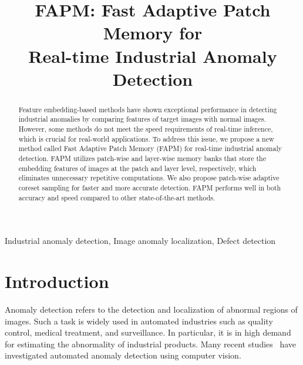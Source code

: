 \documentclass{article}
\title{FAPM: Fast Adaptive Patch Memory for \\Real-time Industrial Anomaly Detection\vspace{-0.2cm}}
\begin{document}
\maketitle

\setlength{\textfloatsep}{7pt}
\begin{abstract}
	    Feature embedding-based methods have shown exceptional performance in detecting industrial anomalies by comparing features of target images with normal images. However, some methods do not meet the speed requirements of real-time inference, which is crucial for real-world applications. To address this issue, we propose a new method called Fast Adaptive Patch Memory (FAPM) for real-time industrial anomaly detection. FAPM utilizes patch-wise and layer-wise memory banks that store the embedding features of images at the patch and layer level, respectively, which eliminates unnecessary repetitive computations. We also propose patch-wise adaptive coreset sampling for faster and more accurate detection. FAPM performs well in both accuracy and speed compared to other state-of-the-art methods.
	    
	\end{abstract}
	
\begin{keywords}
Industrial anomaly detection, Image anomaly localization, Defect detection
\end{keywords}
\vspace{-0.4cm}
	\section{Introduction}
 \vspace{-0.3cm}
    Anomaly detection refers to the detection and localization of abnormal regions of images. Such a task is widely used in automated industries such as quality control, medical treatment, and surveillance. In particular, it is in high demand for estimating the abnormality of industrial products. Many recent studies~\cite{differnet,gan,itad,Padim,patchcore,patchsvdd,SPADE,TSDN} have investigated automated anomaly detection using computer vision.
    
\end{document}
